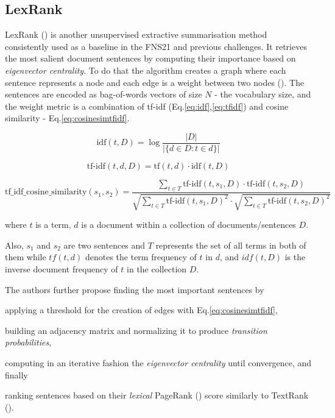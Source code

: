 \subsection{LexRank}\label{subsec:lexrank}
LexRank (\cite{Erkan2004LexRankGC}) is another unsupervised extractive summarisation method consistently used as a baseline in the FNS21 and previous challenges.
It retrieves the most salient document sentences by computing their importance based on \emph{eigenvector centrality}.
To do that the algorithm creates a graph where each sentence represents a node and each edge is a weight between two nodes (\cite{Shearing2020AutomatedTS}).
The sentences are encoded as bag-of-words vectors of size $N$ - the vocabulary size, and the weight metric is a combination of tf-idf (Eq.\ref{eq:idf},\ref{eq:tfidf}) and cosine similarity - Eq.\ref{eq:cosinesimtfidf}.

\begin{equation}
    \text{idf}(t, D) = \log \frac{|D|}{|\{d \in D : t \in d\}|} \label{eq:idf}
\end{equation}

\begin{equation}
    \text{tf-idf}(t, d, D) = \text{tf}(t, d) \cdot \text{idf}(t, D)
    \label{eq:tfidf}
\end{equation}

\begin{equation}
    \text{tf\_idf\_cosine\_similarity}(s_1, s_2) = \frac{\sum_{t \in T} \text{tf-idf}(t, s_1, D) \cdot \text{tf-idf}(t, s_2, D)}{ \sqrt{\sum_{t \in T} \text{tf-idf}(t, s_1, D)^2} \cdot \sqrt{\sum_{t \in T} \text{tf-idf}(t, s_2, D)^2}}
    \label{eq:cosinesimtfidf}
\end{equation}

where $t$ is a term, $d$ is a document within a collection of documents/sentences $D$.

Also, $s_1$ and $s_2$ are two sentences and $T$ represents the set of all terms in both of them while $tf(t, d)$ denotes the term frequency of $t$ in $d$, and $idf(t, D)$ is the inverse document frequency of $t$ in the collection $D$.

The authors further propose finding the most important sentences by \begin{enumerate*}
    \item applying a threshold for the creation of edges with Eq.\ref{eq:cosinesimtfidf},
    \item building an adjacency matrix and normalizing it to produce \emph{transition probabilities},
    \item computing in an iterative fashion the \emph{eigenvector centrality} until convergence, and finally
    \item ranking sentences based on their \emph{lexical} PageRank (\cite{page1998anatomy}) score similarly to TextRank (\cite{mihalcea-tarau-2004-textrank}).
\end{enumerate*}

